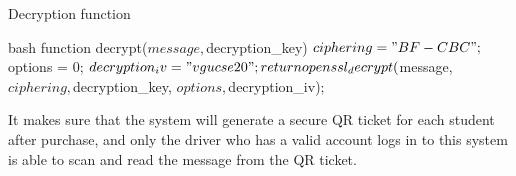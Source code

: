 Decryption function
    \begin{code}{bash}
    function decrypt($message, $decryption_key){
        $ciphering = "BF-CBC";
        $options = 0;
        $decryption_iv = "vgucse20";
    
        return openssl_decrypt($message, $ciphering, $decryption_key, $options, $decryption_iv);
    }
    \end{code}

\noindent It makes sure that the system will generate a secure QR ticket for each student after purchase, and only the driver who has a valid account logs in to this system is able to scan and read the message from the QR ticket.

